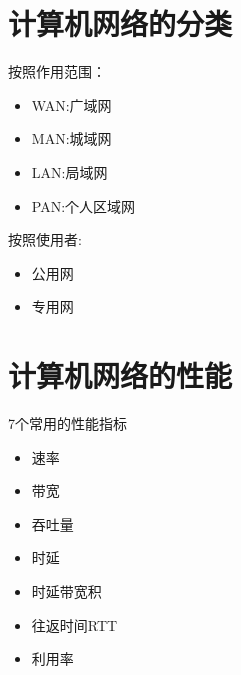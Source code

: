 \documentclass{ctexart}
\begin{document}
\section{计算机网络的分类}
按照作用范围：
\begin{itemize}
    \item WAN:广域网
    \item MAN:城域网
    \item LAN:局域网
    \item PAN:个人区域网
\end{itemize}
按照使用者:

\begin{itemize}
    \item 公用网
    \item 专用网
\end{itemize}

\section{计算机网络的性能}
7个常用的性能指标
\begin{itemize}
    \item 速率
    \item 带宽
    \item 吞吐量
    \item 时延
    \item 时延带宽积
    \item 往返时间RTT
    \item 利用率
\end{itemize}
\end{document}
